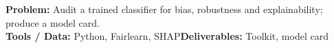 \documentclass[11pt]{article}
\begin{document}
\begin{tcolorbox}[enhanced,breakable,colback=white,colframe=crimson,arc=2mm,boxrule=0.9pt,
  title={\textbf{PV.10\quad Responsible-AI Audit Toolkit}\hfill \colorbox{white}{\textcolor{crimson}{\scriptsize\bfseries MAJOR}}},fonttitle=\color{white},colbacktitle=crimson]
\textbf{\color{navy}Problem:} Audit a trained classifier for bias, robustness and explainability; produce a model card.\\[2pt]
\textbf{\color{navy}Tools / Data:} Python, Fairlearn, SHAP\qquad \textbf{\color{navy}Deliverables:} Toolkit, model card\\[2pt]
\ 
\end{tcolorbox}
\newpage
\end{document}
